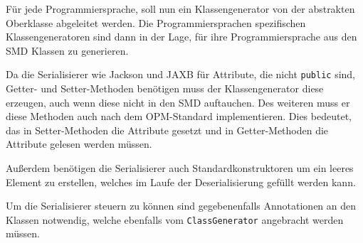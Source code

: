 F\"ur jede Programmiersprache, soll nun ein Klassengenerator von der abstrakten Oberklasse abgeleitet werden. Die Programmiersprachen spezifischen Klassengeneratoren sind dann in der Lage, f\"ur ihre Programmiersprache aus den \ac{SMD} Klassen zu generieren.

Da die Serialisierer wie Jackson und JAXB f\"ur Attribute, die nicht \texttt{public} sind, Getter- und Setter-Methoden ben\"otigen muss der Klassengenerator diese erzeugen, auch wenn diese nicht in den \ac{SMD} auftauchen. Des weiteren muss er diese Methoden auch nach dem OPM-Standard implementieren. Dies bedeutet, das in Setter-Methoden die Attribute gesetzt und in Getter-Methoden die Attribute gelesen werden m\"ussen.

Au\ss{}erdem ben\"otigen die Serialisierer auch Standardkonstruktoren um ein leeres Element zu erstellen, welches im Laufe der Deserialisierung gef\"ullt werden kann.

Um die Serialisierer steuern zu k\"onnen sind gegebenenfalls Annotationen an den Klassen notwendig, welche ebenfalls vom \texttt{ClassGenerator} angebracht werden m\"ussen.



